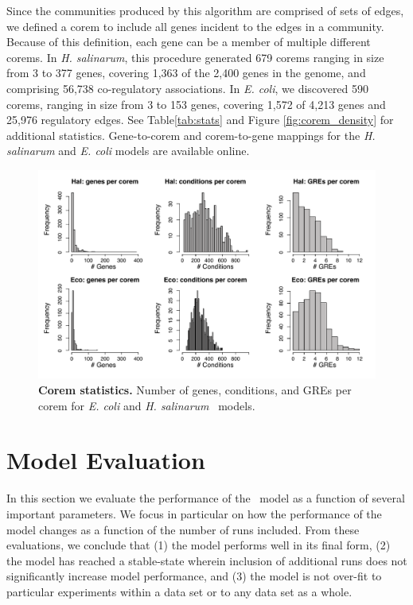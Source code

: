 Since the communities produced by this algorithm are comprised of sets of edges, we defined a corem to include all genes incident to the edges in a community. Because of this definition, each gene can be a member of multiple different corems. In {\it H. salinarum}, this procedure generated 679 corems ranging in size from 3 to 377 genes, covering 1,363 of the 2,400 genes in the genome, and comprising 56,738 co-regulatory associations. In {\it E. coli}, we discovered 590 corems, ranging in size from 3 to 153 genes, covering 1,572 of 4,213 genes and 25,976 regulatory edges. See Table\ref{tab:stats} and Figure \ref{fig:corem_density} for additional statistics. Gene-to-corem and corem-to-gene mappings for the {\it H. salinarum} and {\it E. coli} models are available online.

\begin{figure}[h!]
\centering
\includegraphics[width=0.9\linewidth]{figures/corem_stats.pdf}
\caption[Corem statistics]{
{\bf Corem statistics.} Number of genes, conditions, and GREs per corem for \textit{E. coli} and \textit{H. salinarum} \egrine~models.} 
\label{fig:corem_stats}
\end{figure}

\section{Model Evaluation}

In this section we evaluate the performance of the \egrine\ model as a function of several important parameters. We focus in particular on how the performance of the model changes as a function of the number of runs included. From these evaluations, we conclude that (1) the model performs well in its final form, (2) the model has reached a stable-state wherein inclusion of additional runs does not significantly increase model performance, and (3) the model is not over-fit to particular experiments within a data set or to any data set as a whole.

